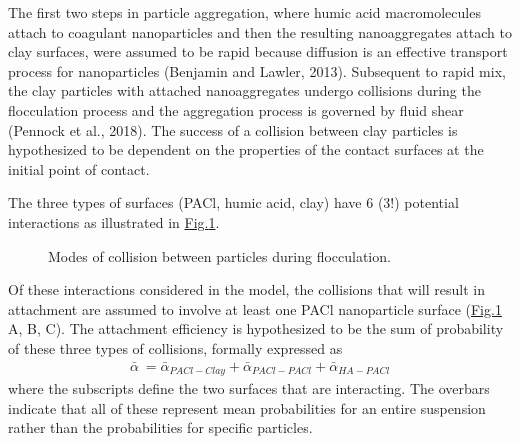\documentclass[letterpaper,10pt,english]{sphinxmanual}
\let\sphinxpxdimen\pdfpxdimen\else\newdimen\sphinxpxdimen
\begin{document}
The first two steps in particle aggregation, where humic acid macromolecules attach to coagulant nanoparticles and then the resulting nanoaggregates attach to clay surfaces, were assumed to be rapid because diffusion is an effective transport process for nanoparticles (Benjamin and Lawler, 2013). Subsequent to rapid mix, the clay particles with attached nanoaggregates undergo collisions during the flocculation process and the aggregation process is governed by fluid shear (Pennock et al., 2018). The success of a collision between clay particles is hypothesized to be dependent on the properties of the contact surfaces at the initial point of contact.

The three types of surfaces (PACl, humic acid, clay) have 6 (3!) potential interactions as illustrated in \hyperref[\detokenize{Flocculation/Floc_Model:figure-du-fig2}]{Fig.\@ \ref{\detokenize{Flocculation/Floc_Model:figure-du-fig2}}}.

\begin{figure}[htbp]
\centering
\capstart

\noindent\sphinxincludegraphics[width=400\sphinxpxdimen]{{Du_Fig2}.png}
\caption{Modes of collision between particles during flocculation.}\label{\detokenize{Flocculation/Floc_Model:id44}}\label{\detokenize{Flocculation/Floc_Model:figure-du-fig2}}\end{figure}

Of these interactions considered in the model, the collisions that will result in attachment are assumed to involve at least one PACl nanoparticle surface (\hyperref[\detokenize{Flocculation/Floc_Model:figure-du-fig2}]{Fig.\@ \ref{\detokenize{Flocculation/Floc_Model:figure-du-fig2}}} A, B, C). The attachment efficiency is hypothesized to be the sum of probability of these three types of collisions, formally expressed as
\begin{equation}\label{equation:Flocculation/Floc_Model:Flocculation/Floc_Model:19}
\begin{split}\bar{\alpha }\ ={\bar{\alpha }}_{PACl-Clay}+{\bar{\alpha }}_{PACl-PACl}+{\bar{\alpha }}_{HA-PACl}\end{split}
\end{equation}
where the subscripts define the two surfaces that are interacting. The overbars indicate that all of these represent mean probabilities for an entire suspension rather than the probabilities for specific particles.
\end{document}
